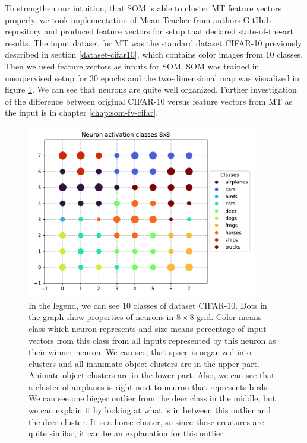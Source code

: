 To strengthen our intuition, that SOM is able to cluster MT feature vectors properly, we took implementation of Mean Teacher from authors GitHub repository \cite{curiousai} and produced feature vectors for setup that declared state-of-the-art results. The input dataset for MT was the standard dataset CIFAR-10 previously described in section \ref{dataset-cifar10}, which contains color images from $10$ classes. Then we used feature vectors as inputs for SOM. SOM was trained in unsupervised setup for $30$ epochs and the two-dimensional map was visualized in figure \ref{fig:som-cluster-mt}. We can see that neurons are quite well organized. Further investigation of the difference between original CIFAR-10 versus feature vectors from MT as the input is in chapter \ref{chap:som-fv-cifar}.

\begin{figure}[h!]
    \centering
    \includegraphics[width=0.9\textwidth]{figs/som-clusters-mt.pdf}
    \caption[SOM clusters from MT feature vectors]{In the legend, we can see $10$ classes of dataset CIFAR-10. Dots in the graph show properties of neurons in $8\times8$ grid. Color means class which neuron represents and size means percentage of input vectors from this class from all inputs represented by this neuron as their winner neuron. We can see, that space is organized into clusters and all inanimate object clusters are in the upper part. Animate object clusters are in the lower part. Also, we can see that a cluster of airplanes is right next to neuron that represents birds. We can see one bigger outlier from the deer class in the middle, but we can explain it by looking at what is in between this outlier and the deer cluster. It is a horse cluster, so since these creatures are quite similar, it can be an explanation for this outlier.}
    \label{fig:som-cluster-mt}
\end{figure}


